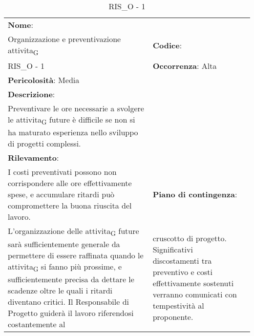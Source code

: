 \renewcommand{\arraystretch}{1.5}
\begin{longtable} { 
		>{\raggedright}p{} 
		>{\raggedright}p{} 
		>{\raggedright}p{}    }
	
	\caption{RIS\_O - 1} \endhead	
	
	
	\textbf{Nome}: \\ Organizzazione e preventivazione \gls{attivita}\textsubscript{G}
	& \textbf{Codice}: \\ RIS\_O - 1
	& \textbf{Occorrenza}: Alta \\ \textbf{Pericolosità}: Media
	
	\tabularnewline
	
	\textbf{Descrizione}: \\ Preventivare le ore necessarie a svolgere le \gls{attivita}\textsubscript{G} future è difficile se non si ha maturato esperienza nello sviluppo di progetti complessi. \\
	\textbf{Rilevamento}: \\ I costi preventivati possono non corrispondere alle ore effettivamente spese, e accumulare ritardi può compromettere la buona riuscita del lavoro.
	& 
	\textbf{Piano di contingenza}: \\ L'organizzazione delle \gls{attivita}\textsubscript{G} future sarà sufficientemente generale da permettere di essere raffinata quando le \gls{attivita}\textsubscript{G} si fanno più prossime, e sufficientemente precisa da dettare le scadenze oltre le quali i ritardi diventano critici. Il Responsabile di Progetto guiderà il lavoro riferendosi costantemente al 
	&  
	cruscotto di progetto. Significativi discostamenti tra preventivo e costi effettivamente sostenuti verranno comunicati con tempestività al proponente.
	
\end{longtable}




